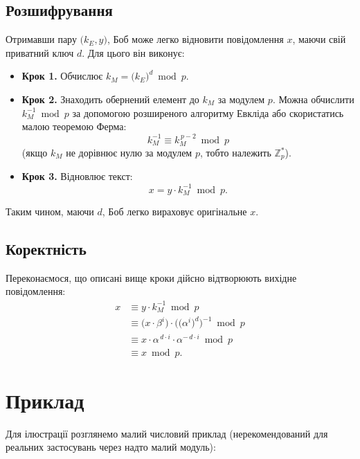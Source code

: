\documentclass[12pt]{report}
\theoremstyle{definition}
\theoremstyle{plain}
\begin{document}
\subsection{Розшифрування}

Отримавши пару \(\bigl(k_E, y\bigr)\), Боб може легко відновити повідомлення \(x\), маючи 
свій приватний ключ \(d\). Для цього він виконує:

\begin{itemize}
    \item \textbf{Крок 1.} Обчислює 
          \(\displaystyle k_M = \bigl(k_E\bigl)^d \bmod p\).
    \item \textbf{Крок 2.} Знаходить обернений елемент до \(k_M\) за модулем \(p\). 
          Можна обчислити \(k_M^{-1} \bmod p\) за допомогою розширеного алгоритму Евкліда 
          або скористатись малою теоремою Ферма:
          \[
             k_M^{-1} \equiv k_M^{\,p-2} \bmod p 
          \]
          (якщо \(k_M\) не дорівнює нулю за модулем \(p\), тобто належить \(\mathbb{Z}_p^*\)).
    \item \textbf{Крок 3.} Відновлює текст:
          \[
             x = y \cdot k_M^{-1} \bmod p.
          \]
\end{itemize}

Таким чином, маючи \(d\), Боб легко вираховує оригінальне \(x\).

\subsection{Коректність}

Переконаємося, що описані вище кроки дійсно відтворюють вихідне повідомлення:
\[
\begin{aligned}
x &\equiv y \cdot k_M^{-1} \bmod p \\
  &\equiv \bigl(x \cdot \beta^i\bigr) \cdot \bigl(\bigl(\alpha^i\bigl)^d\bigr)^{-1} \bmod p \\
  &\equiv x \cdot \alpha^{\,d\cdot i} \cdot \alpha^{-\,d\cdot i} \bmod p \\
  &\equiv x \bmod p.
\end{aligned}
\]

\section{Приклад}

Для ілюстрації розглянемо малий числовий приклад (нерекомендований для реальних 
застосувань через надто малий модуль):
\end{document}
